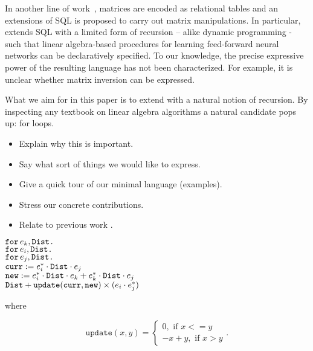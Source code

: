 In another line of work~\cite{}, matrices are encoded as relational tables and an extensions of SQL is proposed to carry out matrix manipulations. In particular, \cite{} extends SQL with a limited form of recursion -- alike dynamic programming - such that linear algebra-based procedures for learning feed-forward neural networks can be declaratively specified. To our knowledge, the precise expressive power of the resulting language has not been characterized. For example, it is unclear whether matrix inversion can be expressed.





What we aim for in this paper is to extend \lang with a natural notion of recursion. By inspecting any textbook on linear algebra algorithms a natural candidate pops up: for loops.


\begin{itemize}
\item Explain why this is important.
\item Say what sort of things we would like to express.
\item Give a quick tour of our minimal language (examples).
\item Stress our concrete contributions.
\item Relate to previous work \cite{matlang,BrijderGBW19,Geerts19,HutchisonHS17}.
\end{itemize}


\noindent
$\texttt{for}\, e_k,\texttt{Dist} \texttt{.}\, $
\\
\hspace*{0.5cm} $\texttt{for}\, e_i,\texttt{Dist} \texttt{.}\, $
\\
\hspace*{1cm} $\texttt{for}\, e_j,\texttt{Dist} \texttt{.}\, $
\\
\hspace*{1.5cm} 
$\texttt{curr} := e_i^*\cdot \texttt{Dist} \cdot e_j$\\
\hspace*{1.5cm} 
$\texttt{new} := e_i^*\cdot \texttt{Dist} \cdot e_k + e_k^*\cdot \texttt{Dist}\cdot e_j$\\
\hspace*{1.5cm}
$\texttt{Dist} + \texttt{update}(\texttt{curr},\texttt{new})\times (e_i\cdot e_j^*)$

where

\[
  			\texttt{update}(x,y)=\begin{cases}
               0, \text{ if } x<=y \\
               -x + y, \text{ if } x > y
            \end{cases}.
		\]
